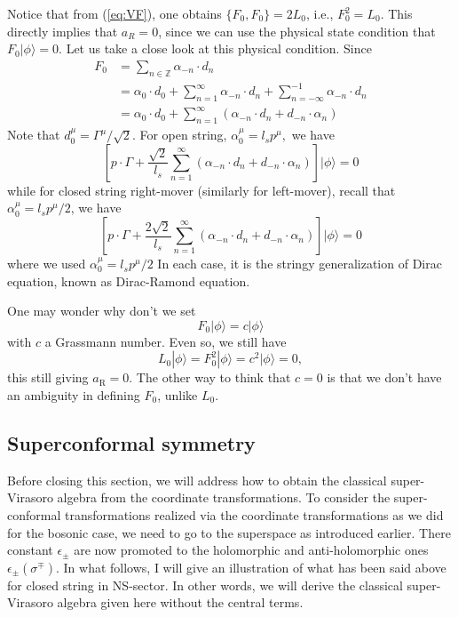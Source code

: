 \documentclass[graybox,envcountchap,sectrefs]{svmono}
\begin{document}
Notice that from (\ref{eq:VF}), one obtains $\{F_0,F_0\}=2L_0$, i.e., $F_0^2=L_0$. This directly implies that $a_R=0$, since we can use the physical state condition that $F_0|\phi\rangle =0$.
Let us take a close look at this physical condition. Since
\begin{equation}
\begin{aligned}
F_{0} &=\sum_{n \in \mathbb{Z}} \alpha_{-n} \cdot d_{n} \\
&=\alpha_{0} \cdot d_{0}+\sum_{n=1}^{\infty} \alpha_{-n} \cdot d_{n}+\sum_{n=-\infty}^{-1} \alpha_{-n} \cdot d_{n} \\
&=\alpha_{0} \cdot d_{0}+\sum_{n=1}^{\infty}\left(\alpha_{-n} \cdot d_{n}+d_{-n} \cdot \alpha_{n}\right)
\end{aligned}
\end{equation}
Note that $d_{0}^{\mu}=\Gamma^{\mu} / \sqrt{2} .$ For open string, $\alpha_{0}^{\mu}=l_{s} p^{\mu},$ we have
\begin{equation}
\left[p \cdot \Gamma+\frac{\sqrt{2}}{l_{s}} \sum_{n=1}^{\infty}\left(\alpha_{-n} \cdot d_{n}+d_{-n} \cdot \alpha_{n}\right)\right]|\phi\rangle=0
\end{equation}
while for closed string right-mover (similarly for left-mover), recall that $\alpha_0^{\mu}=l_sp^{\mu}/2$, we have
\begin{equation}
\left[p \cdot \Gamma+\frac{2 \sqrt{2}}{l_{s}} \sum_{n=1}^{\infty}\left(\alpha_{-n} \cdot d_{n}+d_{-n} \cdot \alpha_{n}\right)\right]|\phi\rangle=0
\end{equation}
where we used $\alpha_{0}^{\mu}=l_{s} p^{\mu} / 2$
In each case, it is the stringy generalization of Dirac equation, known as Dirac-Ramond equation.

One may wonder why don't we set
\begin{equation}
F_{0}|\phi\rangle=c|\phi\rangle
\end{equation}
with $c$ a Grassmann number. Even so, we still have
\begin{equation}
L_{0}|\phi\rangle=F_{0}^{2}|\phi\rangle=c^{2}|\phi\rangle=0,
\end{equation}
this still giving $a_{\mathrm{R}}=0 .$ The other way to think that $c=0$ is that we don't have an ambiguity in defining $F_{0}$, unlike $L_{0}$.

\subsection{Superconformal symmetry}
Before closing this section, we will address how to obtain the classical super-Virasoro algebra from the coordinate transformations. 
To consider the super-conformal transformations realized via the coordinate transformations as we did for the bosonic case, we need to go to the superspace as introduced earlier. 
There constant $\epsilon_{\pm}$ are now promoted to the holomorphic and anti-holomorphic ones $\epsilon_{\pm}\left(\sigma^{\mp}\right)$.
In what follows, I will give an illustration of what has been said above for closed string in NS-sector. 
In other words, we will derive the classical super-Virasoro algebra given here without the central terms.
\end{document}
